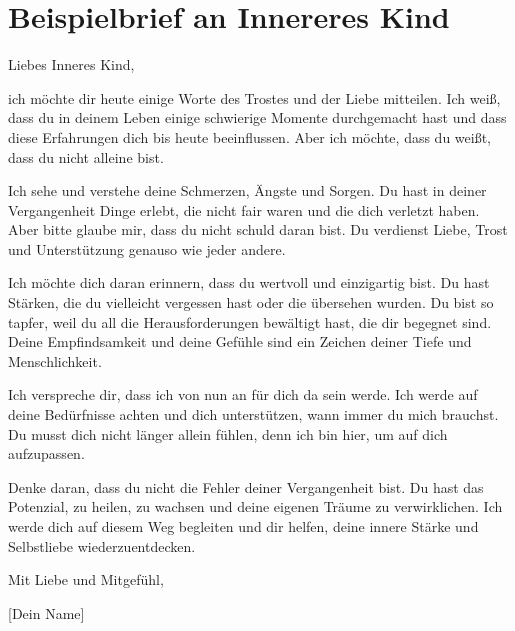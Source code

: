\section{Beispielbrief an Innereres Kind}
Liebes Inneres Kind,

ich möchte dir heute einige Worte des Trostes und der Liebe mitteilen. Ich weiß, dass du in deinem Leben einige schwierige Momente durchgemacht hast und dass diese Erfahrungen dich bis heute beeinflussen. Aber ich möchte, dass du weißt, dass du nicht alleine bist.

Ich sehe und verstehe deine Schmerzen, Ängste und Sorgen. Du hast in deiner Vergangenheit Dinge erlebt, die nicht fair waren und die dich verletzt haben. Aber bitte glaube mir, dass du nicht schuld daran bist. Du verdienst Liebe, Trost und Unterstützung genauso wie jeder andere.

Ich möchte dich daran erinnern, dass du wertvoll und einzigartig bist. Du hast Stärken, die du vielleicht vergessen hast oder die übersehen wurden. Du bist so tapfer, weil du all die Herausforderungen bewältigt hast, die dir begegnet sind. Deine Empfindsamkeit und deine Gefühle sind ein Zeichen deiner Tiefe und Menschlichkeit.

Ich verspreche dir, dass ich von nun an für dich da sein werde. Ich werde auf deine Bedürfnisse achten und dich unterstützen, wann immer du mich brauchst. Du musst dich nicht länger allein fühlen, denn ich bin hier, um auf dich aufzupassen.

Denke daran, dass du nicht die Fehler deiner Vergangenheit bist. Du hast das Potenzial, zu heilen, zu wachsen und deine eigenen Träume zu verwirklichen. Ich werde dich auf diesem Weg begleiten und dir helfen, deine innere Stärke und Selbstliebe wiederzuentdecken.

Mit Liebe und Mitgefühl,

[Dein Name]

